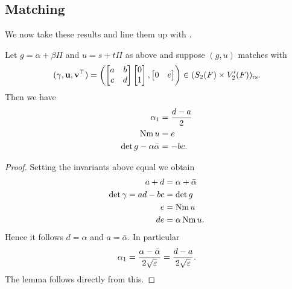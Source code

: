 \subsection{Matching}
We now take these results and line them up with .

\begin{lemma}
  \label{lem:finale_match}
  Let $g = \alpha + \beta \Pi$ and $u = s + t \Pi$ as above
  and suppose $(g,u)$ matches with
  \[ (\gamma, \mathbf u, \mathbf v^\top) = \left( \begin{bmatrix} a & b \\ c & d \end{bmatrix}
    \begin{bmatrix} 0 \\ 1 \end{bmatrix}, \begin{bmatrix} 0 & e \end{bmatrix} \right)
    \in (S_2(F) \times V'_2(F))_{\mathrm{rs}}. \]
  Then we have
  \begin{align*}
    \alpha_1 &= \frac{d-a}{2} \\
    \operatorname{Nm} u &= e \\
    \det g - \alpha \bar \alpha &= -bc.
  \end{align*}
\end{lemma}
\begin{proof}
  Setting the invariants above equal we obtain
  \begin{align*}
    a + d &= \alpha + \bar\alpha \\
    \det \gamma = ad - bc &= \det g \\
    e &= \operatorname{Nm} u \\
    de &= \alpha \operatorname{Nm} u.
  \end{align*}
  Hence it follows $d = \alpha$ and $a = \bar\alpha$.
  In particular
  \[ \alpha_1 = \frac{\alpha - \bar\alpha}{2\sqrt{\varepsilon}} = \frac{d-a}{2\sqrt{\varepsilon}}. \]
  The lemma follows directly from this.
\end{proof}

